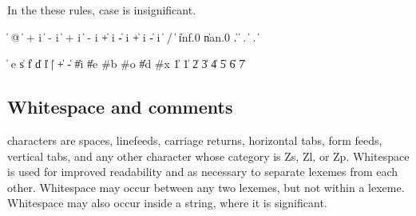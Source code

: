 In the these rules, case is insignificant.

\begin{grammar}%
 \:  
 \: %
      \|  @ 
   \> \|  +  i %
      \|  -  i
   \> \|  + i %
      \|  - i
   \> \| +  i %
      \| -  i %
      \| + i %
      \| - i
 \:  
 \: %
   \> \|  / 
   \> \|  
   \> \| inf.0 \| nan.0
 \: %
          
   \> \| .  \arbno{\#} 
   \> \|  .  \arbno{\#} 
   \> \|  \atleastone{\#} . \arbno{\#} 
 \:  \arbno{\#}
 \: %
          
   \> \|  
\end{grammar}

\begin{grammar}%
 \:  
   \> \|   
 \: e \| s \| f \| d \| l
 \: 
   \> \| | 
 \:   \| + \|  -
 \:  \| \#i \| \#e
 \: \#b
 \: \#o
 \:  \| \#d
 \: \#x
  \| 1
  \| 1 \| 2 \| 3 \| 4 \| 5 \| 6 \| 7
 \: 
 \: 
\end{grammar}


\subsection{Whitespace and comments}

 characters are spaces, linefeeds,
carriage returns, horizontal tabs, form feeds, vertical tabs,
and any other character whose category is Zs, Zl, or Zp.
Whitespace is used for improved readability and
as necessary to separate lexemes from each other.  Whitespace may
occur between any two lexemes,
but not within a lexeme.  Whitespace may also occur inside a string,
where it is significant.

